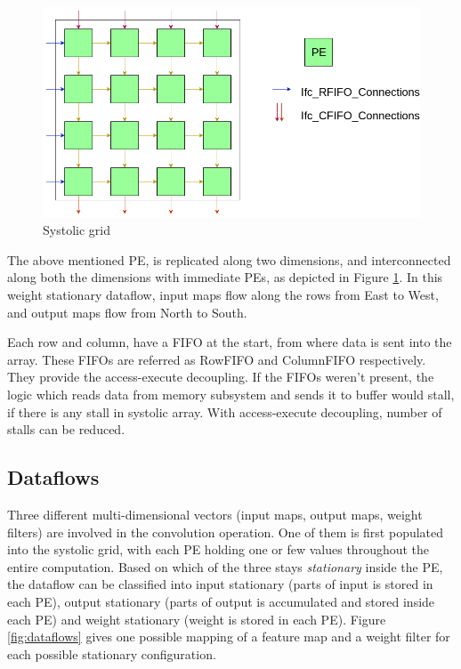 \begin{figure}
    \centering
    \includegraphics[scale=0.4]{images/grid.png}
    \caption{Systolic grid}
    \label{fig:fig2}
\end{figure}

The above mentioned PE, is replicated along two dimensions, and interconnected along both the dimensions with immediate PEs, as depicted in Figure \ref{fig:fig2}. In this weight stationary dataflow, input maps flow along the rows from East to West, and output maps flow from North to South.

Each row and column, have a FIFO at the start, from where data is sent into the array. These FIFOs are referred as RowFIFO and ColumnFIFO respectively. They provide the access-execute decoupling. If the FIFOs weren't present, the logic which reads data from memory subsystem and sends it to buffer would stall, if there is any stall in systolic array. With access-execute decoupling, number of stalls can be reduced.

\subsection{Dataflows}
Three different multi-dimensional vectors (input maps, output maps, weight filters) are involved in the convolution operation. One of them is first populated into the systolic grid, with each PE holding one or few values throughout the entire computation. Based on which of the three stays {\em stationary} inside the PE, the dataflow can be classified into input stationary (parts of input is stored in each PE), output stationary (parts of output is accumulated and stored inside each PE) and weight stationary (weight is stored in each PE). Figure \ref{fig:dataflows} gives one possible mapping of a feature map and a weight filter for each possible stationary configuration.

